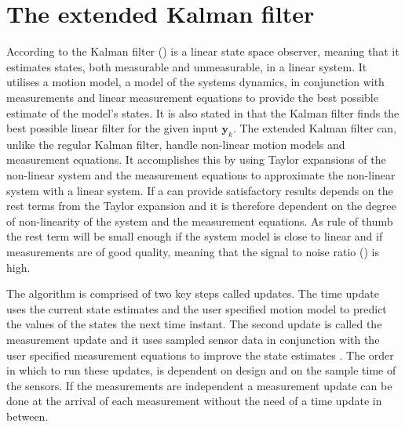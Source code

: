 \section{The extended Kalman filter}
According to \citet{sensorfusion} the Kalman filter (\abbrKF) is a linear state space observer, meaning that it estimates states, both measurable and unmeasurable, in a linear system. It utilises a motion model, a model of the systems dynamics, in conjunction with measurements and linear measurement equations to provide the best possible estimate of the model's states. It is also stated in \citet{sensorfusion} that the Kalman filter finds the best possible linear filter for the given input $\boldsymbol{y}_{k}$. The extended Kalman filter can, unlike the regular Kalman filter, handle non-linear motion models and measurement equations. It accomplishes this by using Taylor expansions of the non-linear system and the measurement equations to approximate the non-linear system with a linear system. If a \abbrEKF can provide satisfactory results depends on the rest terms from the Taylor expansion and it is therefore dependent on the degree of non-linearity of the system and the measurement equations\citep{sensorfusion}. As rule of thumb the rest term will be small enough if the system model is close to linear and if measurements are of good quality, meaning that the signal to noise ratio (\abbrSNR) is high\citep{sensorfusion}. 

The \abbrEKF algorithm is comprised of two key steps called updates.
The time update uses the current state estimates and the user specified motion model to predict the values of the states the next time instant. The second update is called the measurement update and it uses sampled sensor data in conjunction with the user specified measurement equations to improve the state estimates \citep{sensorfusion}.
The order in which to run these updates, is dependent on design and on the sample time of the sensors. If the measurements are independent a measurement update can be done at the arrival of each measurement without the need of a time update in between\citep[p.170]{sensorfusion}.


